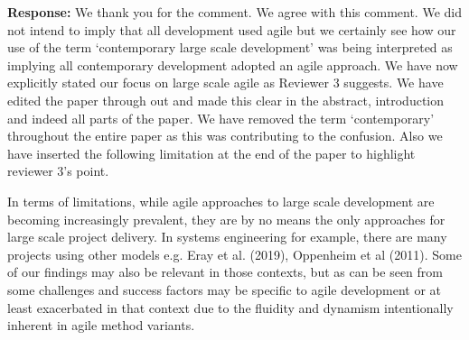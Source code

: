 \documentclass[a4paper,twoside,11pt]{reviewresponse}
\begin{document}
\textbf{Response:}
We thank you for the comment. We agree with this comment. We did not intend to imply that all development used agile but we  certainly see how our use of the term `contemporary large scale development' was being interpreted as implying all contemporary development adopted an agile approach. We have now explicitly stated our focus on large scale agile as Reviewer 3 suggests. We have edited the paper through out and made this clear in the abstract, introduction and indeed all parts of the paper. We have removed the term `contemporary' throughout the entire paper as this was contributing to the confusion. Also we have inserted the following limitation at the end of the paper to highlight reviewer 3's point. 

In terms of limitations, while agile approaches to large scale development are becoming increasingly prevalent, they are by no means the only approaches for large scale project delivery.  In systems engineering for example, there are many projects using other models e.g. Eray et al. (2019), Oppenheim et al (2011). Some of our findings may also be relevant in those contexts, but as can be seen from some challenges and success factors may be specific to agile development or at least exacerbated in that context due to the fluidity and dynamism intentionally inherent in agile method variants.
\end{document}
